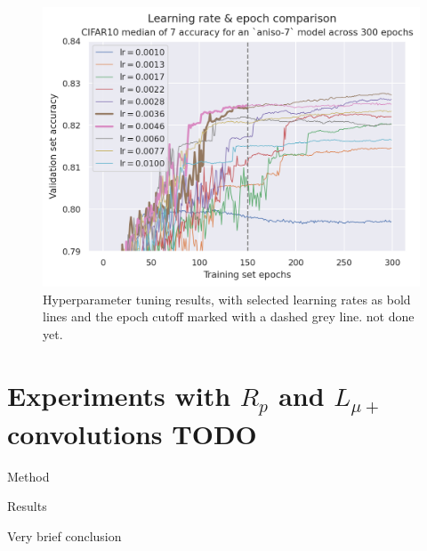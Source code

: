 \documentclass[a4paper, 12pt]{report}
\def\comment#1{\color{red}#1\color{black}}
\begin{document}
\begin{figure}[h!]
	\center
  \includegraphics[width=\textwidth]{figures/tuning.png}
  \caption{Hyperparameter tuning results, with selected learning rates as bold lines and the epoch cutoff marked with a dashed grey line. \comment{not done yet.}}
  \label{fig:tuning}
\end{figure}


\newpage
\section{Experiments with $R_p$ and $L_{\mu+}$ convolutions \comment{TODO} }
\label{sec:nonlinconv}
\comment{Method}

\comment{Results}

\comment{Very brief conclusion}
\end{document}
